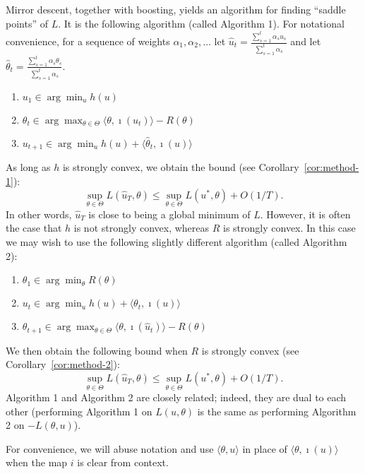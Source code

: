 \documentclass[paper.tex]{subfiles}
\begin{document}
Mirror descent, together with boosting, yields an algorithm for finding 
``saddle points'' of $L$. It is the following algorithm (called Algorithm 1).
For notational convenience, for a sequence of weights $\alpha_1,\alpha_2,\ldots$ 
let $\hat{u}_t = \frac{\sum_{s=1}^t \alpha_su_s}{\sum_{s=1}^t \alpha_s}$ and let 
$\hat{\theta}_t = \frac{\sum_{s=1}^t \alpha_s\theta_s}{\sum_{s=1}^t \alpha_s}$.
\begin{enumerate}
\item $u_1 \in \arg\min_u h(u)$
\item $\theta_{t} \in \arg\max_{\theta \in \Theta} \langle \theta, \imath(u_t) \rangle - R(\theta)$
\item $u_{t+1} \in \arg\min_{u} h(u) + \langle \hat{\theta}_t, \imath(u) \rangle$
\end{enumerate}
As long as $h$ is strongly convex, we obtain the 
bound (see Corollary~\ref{cor:method-1}):
\begin{equation}
\sup_{\theta \in \Theta} L(\hat{u}_T, \theta) \leq \sup_{\theta \in \Theta} L(u^*, \theta) + O(1/T).
\end{equation}
In other words, $\hat{u}_T$ is close to being a global minimum of $L$.
However, it is often the case that $h$ is not strongly convex, whereas $R$ is strongly convex. In this case 
we may wish to use the following slightly different algorithm (called Algorithm 2):
\begin{enumerate}
\item $\theta_1 \in \arg\min_{\theta} R(\theta)$
\item $u_t \in \arg\min_{u} h(u) + \langle \theta_t, \imath(u) \rangle$
\item $\theta_{t+1} \in \arg\max_{\theta \in \Theta} \langle \theta, \imath(\hat{u}_t) \rangle - R(\theta)$
\end{enumerate}
We then obtain the following bound 
when $R$ is strongly convex (see Corollary~\ref{cor:method-2}):
\[ \sup_{\theta \in \Theta} L(\hat{u}_T, \theta) \leq \sup_{\theta \in \Theta} L(u^*, \theta) + O(1/T). \]
Algorithm 1 and Algorithm 2 are closely related; indeed, they are dual to each other 
(performing Algorithm 1 on $L(u,\theta)$ is the same as performing Algorithm 2 on 
$-L(\theta,u)$).

For convenience, we will abuse notation and use $\langle \theta, u \rangle$ in place of 
$\langle \theta, \imath(u) \rangle$ when the map $i$ is clear from context.
\end{document}
